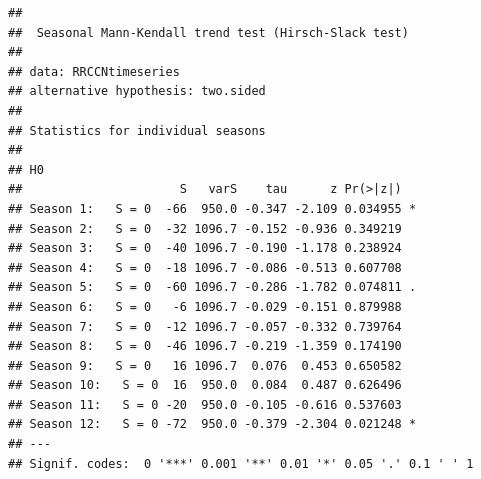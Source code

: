 \documentclass[12pt,]{article}
\newenvironment{Shaded}{\begin{snugshade}}{\end{snugshade}}
\newcommand{\CommentTok}[1]{\textcolor[rgb]{0.56,0.35,0.01}{\textit{#1}}}
\newcommand{\DataTypeTok}[1]{\textcolor[rgb]{0.13,0.29,0.53}{#1}}
\newcommand{\DecValTok}[1]{\textcolor[rgb]{0.00,0.00,0.81}{#1}}
\newcommand{\KeywordTok}[1]{\textcolor[rgb]{0.13,0.29,0.53}{\textbf{#1}}}
\newcommand{\NormalTok}[1]{#1}
\newcommand{\OperatorTok}[1]{\textcolor[rgb]{0.81,0.36,0.00}{\textbf{#1}}}
\newcommand{\StringTok}[1]{\textcolor[rgb]{0.31,0.60,0.02}{#1}}
\begin{document}
\begin{verbatim}
## 
##  Seasonal Mann-Kendall trend test (Hirsch-Slack test)
## 
## data: RRCCNtimeseries
## alternative hypothesis: two.sided
## 
## Statistics for individual seasons
## 
## H0
##                      S   varS    tau      z Pr(>|z|)  
## Season 1:   S = 0  -66  950.0 -0.347 -2.109 0.034955 *
## Season 2:   S = 0  -32 1096.7 -0.152 -0.936 0.349219  
## Season 3:   S = 0  -40 1096.7 -0.190 -1.178 0.238924  
## Season 4:   S = 0  -18 1096.7 -0.086 -0.513 0.607708  
## Season 5:   S = 0  -60 1096.7 -0.286 -1.782 0.074811 .
## Season 6:   S = 0   -6 1096.7 -0.029 -0.151 0.879988  
## Season 7:   S = 0  -12 1096.7 -0.057 -0.332 0.739764  
## Season 8:   S = 0  -46 1096.7 -0.219 -1.359 0.174190  
## Season 9:   S = 0   16 1096.7  0.076  0.453 0.650582  
## Season 10:   S = 0  16  950.0  0.084  0.487 0.626496  
## Season 11:   S = 0 -20  950.0 -0.105 -0.616 0.537603  
## Season 12:   S = 0 -72  950.0 -0.379 -2.304 0.021248 *
## ---
## Signif. codes:  0 '***' 0.001 '**' 0.01 '*' 0.05 '.' 0.1 ' ' 1
\end{verbatim}

\begin{Shaded}
\end{Shaded}
\end{document}
